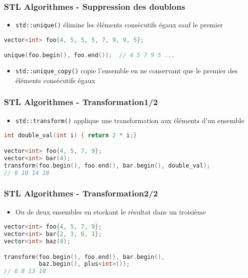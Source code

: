 \documentclass[C++.tex]{subfiles}
\begin{document}
\begin{frame}[fragile]
	\frametitle{STL Algorithmes - Suppression des doublons}
	\begin{itemize}
		\item \lstinline|std::unique()| \og élimine\fg{} les éléments consécutifs égaux sauf le premier
	\end{itemize}


	\begin{lstlisting}[language=C++]
vector<int> foo{4, 5, 5, 5, 7, 9, 9, 5};

unique(foo.begin(), foo.end());  // 4 5 7 9 5 ... \end{lstlisting}

	\begin{itemize}
		\item \lstinline|std::unique_copy()| copie l'ensemble en ne conservant que le premier des éléments consécutifs égaux
	\end{itemize}
\end{frame}

\begin{frame}[fragile]
	\frametitle{STL Algorithmes - Transformation\titlehfill{}1/2}
	\begin{itemize}
		\item \lstinline|std::transform()| applique une transformation aux éléments d'un ensemble
	\end{itemize}

	\begin{lstlisting}[language=C++]
int double_val(int i) { return 2 * i;}

vector<int> foo{4, 5, 7, 9};
vector<int> bar(4);
transform(foo.begin(), foo.end(), bar.begin(), double_val);
// 8 10 14 18\end{lstlisting}
\end{frame}

\begin{frame}[fragile]
	\frametitle{STL Algorithmes - Transformation\titlehfill{}2/2}
	\begin{itemize}
		\item Ou de deux ensembles en stockant le résultat dans un troisième
	\end{itemize}

	\begin{lstlisting}[language=C++]
vector<int> foo{4, 5, 7, 9};
vector<int> bar{2, 3, 6, 1};
vector<int> baz(4);

transform(foo.begin(), foo.end(), bar.begin(), 
          baz.begin(), plus<int>());
// 6 8 13 10\end{lstlisting}
\end{frame}
\end{document}
